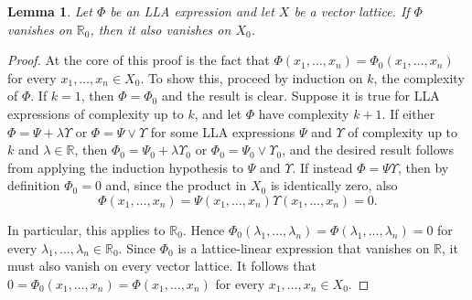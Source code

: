 \documentclass{memo-l}
\newtheorem{lem}[theorem]{Lemma}
\theoremstyle{definition}
\theoremstyle{remark}
\numberwithin{section}{chapter}
\numberwithin{equation}{chapter}
\newcommand\R{\ensuremath{\mathbb{R}}}
\begin{document}
\begin{lem}\label{lem:calc_zero_step1}
    Let $\Phi$ be an LLA expression and let $X$ be a
    vector lattice. If $\Phi$ vanishes on $\R_0$, then it also vanishes
    on $X_0$.
\end{lem}
\begin{proof}
    At the core of this proof is the fact that $\Phi (x_1,\ldots ,x_n)=\Phi _0 (x_1,\ldots ,x_n)$ for
    every $x_1,\ldots ,x_n \in X_0$. To show this, proceed by induction on $k$, the
    complexity of $\Phi $. If $k=1$, then $\Phi =\Phi_0$ and the result
    is clear. Suppose it is true for LLA expressions of complexity up to
    $k$, and let $\Phi $ have complexity $k+1$. If either
    $\Phi =\Psi + \lambda \Upsilon  $ or $\Phi =\Psi \vee \Upsilon  $ for some LLA
    expressions $\Psi $ and $\Upsilon $ of complexity up to $k$ and $\lambda \in
    \R$, then $\Phi _0=\Psi _0+\lambda \Upsilon_0$ or $\Phi _0=\Psi
    _0\vee \Upsilon_0$, and the desired result follows from applying
    the induction hypothesis to $\Psi $ and $\Upsilon$.
    If instead $\Phi =\Psi \Upsilon $, then by definition $\Phi _0=0$
    and, since the product in $X_0$ is identically zero, also
    \[
    \Phi (x_1,\ldots ,x_n)=\Psi (x_1,\ldots ,x_n)\Upsilon (x_1,\ldots
    ,x_n)=0.
    \]

    In particular, this applies to $\R_0$. Hence $\Phi _0 (\lambda
    _1,\ldots ,\lambda _n)=\Phi (\lambda _1,\ldots ,\lambda _n)=0$ for
    every $\lambda _1,\ldots ,\lambda _n \in \R_0$. Since $\Phi _0$ is
    a
    lattice-linear expression that vanishes on \R, it must also vanish
    on every vector lattice. It
    follows that $0=\Phi _0 (x_1,\ldots ,x_n)=\Phi (x_1,\ldots ,x_n)$ for
    every $x_1,\ldots ,x_n \in X_0$.
\end{proof}
\end{document}
